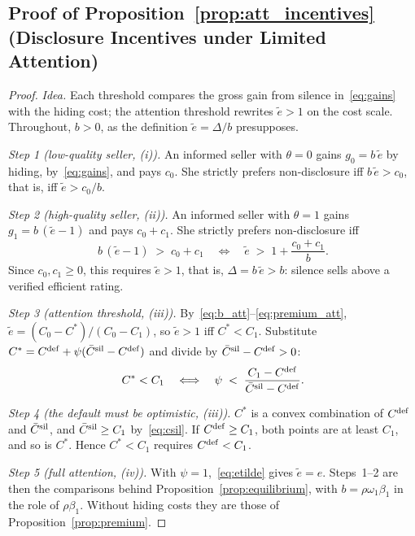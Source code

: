 \subsection*{Proof of Proposition~\ref{prop:att_incentives} (Disclosure Incentives under Limited Attention)}

\begin{proof}\upshape
\emph{Idea.} Each threshold compares the gross gain from silence in~\eqref{eq:gains} with the hiding cost; the attention threshold rewrites $\tilde e>1$ on the cost scale. Throughout, $b>0$, as the definition $\tilde e=\Delta/b$ presupposes.

\emph{Step 1 (low-quality seller, (i)).} An informed seller with $\theta=0$ gains $g_0=b\,\tilde e$ by hiding, by~\eqref{eq:gains}, and pays $c_0$. She strictly prefers non-disclosure iff $b\,\tilde e>c_0$, that is, iff $\tilde e>c_0/b$.

\emph{Step 2 (high-quality seller, (ii)).} An informed seller with $\theta=1$ gains $g_1=b\,(\tilde e-1)$ and pays $c_0+c_1$. She strictly prefers non-disclosure iff
\begin{equation*}
    b\,(\tilde e-1)\;>\;c_0+c_1\quad\Longleftrightarrow\quad\tilde e\;>\;1+\frac{c_0+c_1}{b}.
\end{equation*}
Since $c_0,c_1\ge0$, this requires $\tilde e>1$, that is, $\Delta=b\,\tilde e>b$: silence sells above a verified efficient rating.

\emph{Step 3 (attention threshold, (iii)).} By~\eqref{eq:b_att}--\eqref{eq:premium_att}, $\tilde e=(C_0-C^*)/(C_0-C_1)$, so $\tilde e>1$ iff $C^*<C_1$. Substitute $C^*=C^{\rm def}+\psi(\bar C^{\rm sil}-C^{\rm def})$ and divide by $\bar C^{\rm sil}-C^{\rm def}>0$:
\begin{equation*}
    C^*<C_1\quad\Longleftrightarrow\quad\psi\;<\;\frac{C_1-C^{\rm def}}{\bar C^{\rm sil}-C^{\rm def}}.
\end{equation*}

\emph{Step 4 (the default must be optimistic, (iii)).} $C^*$ is a convex combination of $C^{\rm def}$ and $\bar C^{\rm sil}$, and $\bar C^{\rm sil}\ge C_1$ by~\eqref{eq:csil}. If $C^{\rm def}\ge C_1$, both points are at least $C_1$, and so is $C^*$. Hence $C^*<C_1$ requires $C^{\rm def}<C_1$.

\emph{Step 5 (full attention, (iv)).} With $\psi=1$,~\eqref{eq:etilde} gives $\tilde e=e$. Steps~1--2 are then the comparisons behind Proposition~\ref{prop:equilibrium}, with $b=\rho\omega_1\beta_1$ in the role of $\rho\beta_1$. Without hiding costs they are those of Proposition~\ref{prop:premium}.
\end{proof}

